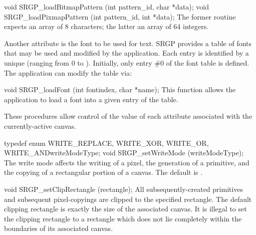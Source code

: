 \newsynopsis
void SRGP_loadBitmapPattern (int pattern_id, char *data);
void SRGP_loadPixmapPattern (int pattern_id, int *data);
\endsynopsis
The former routine expects an array of 8 characters; the latter an array of 64
integers.  

\newpar
Another attribute is the font to be used for text.  SRGP provides a table of
fonts that may be used and modified by the application.  Each entry is
identified by a unique  (ranging from 0 to
).
Initially, only entry \#0 of the font table is defined.
The application can modify the table via:

\newsynopsis
void SRGP_loadFont (int fontindex, char *name);
\endsynopsis
This function allows the application to load a font
into a given entry of the table.  




These procedures allow control of the value of each attribute
associated with the currently-active canvas.


\newsynopsis
typedef enum \lb{}WRITE_REPLACE, WRITE_XOR, WRITE_OR, WRITE_AND\rb writeModeType;
void SRGP_setWriteMode (writeModeType);
\endsynopsis
The write mode affects the writing of a pixel, the generation of a
primitive, and the copying of a rectangular portion of a canvas.  The
default is .  


\nextsynopsis
void SRGP_setClipRectangle (rectangle);
\endsynopsis
All subsequently-created primitives and subsequent pixel-copyings are clipped
to the specified rectangle. The default clipping rectangle is exactly the size
of the associated canvas.  It is illegal to set the clipping rectangle to a
rectangle which does not lie completely within the boundaries of its associated
canvas.

